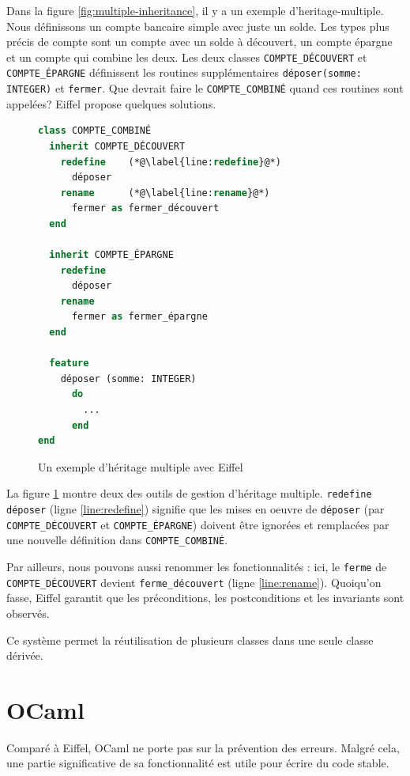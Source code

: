 \documentclass[french]{report}
\begin{document}
Dans la figure \ref{fig:multiple-inheritance}, il y a un exemple d'\gls{heritage-multiple}. Nous définissons un compte bancaire simple avec juste un solde. Les types plus précis de compte sont un compte avec un solde à découvert, un compte épargne et un compte qui combine les deux. Les deux classes \texttt{COMPTE\_DÉCOUVERT} et \texttt{COMPTE\_ÉPARGNE} définissent les routines supplémentaires \texttt{déposer(somme: INTEGER)} et \texttt{fermer}. Que devrait faire le \texttt{COMPTE\_COMBINÉ} quand ces routines sont appelées? Eiffel propose quelques solutions.


\begin{figure}[h]
	\begin{lstlisting}[language=Eiffel]
class COMPTE_COMBINÉ
  inherit COMPTE_DÉCOUVERT
    redefine	(*@\label{line:redefine}@*)
      déposer
    rename		(*@\label{line:rename}@*)
      fermer as fermer_découvert
  end
  
  inherit COMPTE_ÉPARGNE
    redefine
      déposer
    rename
      fermer as fermer_épargne
  end
  
  feature
    déposer (somme: INTEGER)
      do
        ...
      end
end
	\end{lstlisting}
	
	\caption{Un exemple d'héritage multiple avec Eiffel}
	\label{fig:multiple-inheritance-code}
\end{figure}

La figure \ref{fig:multiple-inheritance-code} montre deux des outils de gestion d'héritage multiple. \texttt{redefine déposer} (ligne \ref{line:redefine}) signifie que les mises en oeuvre de \texttt{déposer} (par \texttt{COMPTE\_DÉCOUVERT} et \texttt{COMPTE\_ÉPARGNE}) doivent être ignorées et remplacées par une nouvelle définition dans \texttt{COMPTE\_COMBINÉ}.

Par ailleurs, nous pouvons aussi renommer les fonctionnalités : ici, le \texttt{ferme} de \texttt{COMPTE\_DÉCOUVERT} devient \texttt{ferme\_découvert} (ligne \ref{line:rename}). Quoiqu'on fasse, Eiffel garantit que les préconditions, les postconditions et les invariants sont observés.

Ce système permet la réutilisation de plusieurs classes dans une seule classe dérivée. %

\chapter{OCaml}

Comparé à Eiffel, OCaml ne porte pas sur la prévention des erreurs. Malgré cela, une partie significative de sa fonctionnalité est utile pour écrire du code stable.
\end{document}
